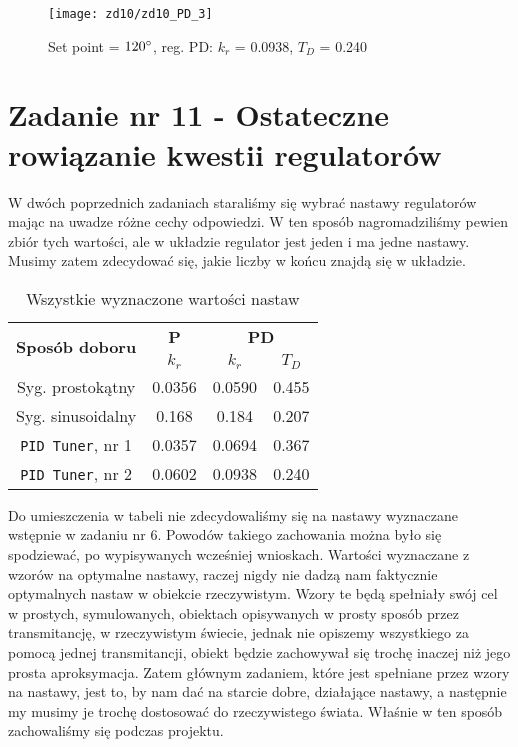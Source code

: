 \documentclass[11 pt]{article}
\begin{document}
\begin{figure}[h!]
	\centerline{
		\texttt{[image: zd10/zd10\_PD\_3]}
	}
	\caption{Set point = $120 \degree$, reg. PD: $k_r$ = 0.0938, $T_D$ = 0.240}
\end{figure}

\newpage

\setcounter{section}{11}
\setcounter{figure}{0}
\section*{Zadanie nr 11 - Ostateczne rowiązanie kwestii regulatorów}

W dwóch poprzednich zadaniach staraliśmy się wybrać nastawy regulatorów mając na uwadze różne cechy odpowiedzi. W ten sposób nagromadziliśmy pewien zbiór tych wartości, ale w układzie regulator jest jeden i ma jedne nastawy. Musimy zatem zdecydować się, jakie liczby w końcu znajdą się w układzie.

\begin{table}[h!]
	\center
	\begin{tabular}{|c|c|c|c|}
		\hline
		\multirow{2}{*}{\textbf{Sposób doboru}} & \textbf{P} & \multicolumn{2}{c|}{\textbf{PD}}\\
		\cline{2-4}
		& $k_r$ & $k_r$ & $T_D$\\
		\hline
		Syg. prostokątny & 0.0356 & 0.0590 & 0.455\\
		Syg. sinusoidalny & 0.168 & 0.184 & 0.207\\
		\texttt{PID Tuner}, nr 1& 0.0357 & 0.0694 & 0.367\\
		\texttt{PID Tuner}, nr 2& 0.0602 & 0.0938 & 0.240\\
		\hline
	\end{tabular}
	\caption{Wszystkie wyznaczone wartości nastaw}
\end{table}

Do umieszczenia w tabeli nie zdecydowaliśmy się na nastawy wyznaczane wstępnie w zadaniu nr 6. Powodów takiego zachowania można było się spodziewać, po wypisywanych wcześniej wnioskach. Wartości wyznaczane z wzorów na optymalne nastawy, raczej nigdy nie dadzą nam faktycznie optymalnych nastaw w obiekcie rzeczywistym. Wzory te będą spełniały swój cel w prostych, symulowanych, obiektach opisywanych w prosty sposób przez transmitancję, w rzeczywistym świecie, jednak nie opiszemy wszystkiego za pomocą jednej transmitancji, obiekt będzie zachowywał się trochę inaczej niż jego prosta aproksymacja. Zatem głównym zadaniem, które jest spełniane przez wzory na nastawy, jest to, by nam dać na starcie dobre, działające nastawy, a następnie my musimy je trochę dostosować do rzeczywistego świata. Właśnie w ten sposób zachowaliśmy się podczas projektu.
\end{document}
